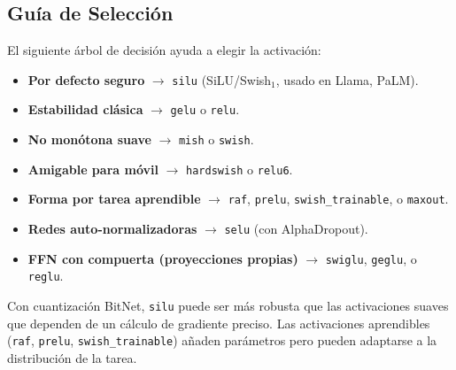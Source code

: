 \subsection{Guía de Selección}

El siguiente árbol de decisión ayuda a elegir la activación:
\begin{itemize}[leftmargin=*]
  \item \textbf{Por defecto seguro} $\to$ \texttt{silu} (SiLU/Swish$_1$, usado
    en Llama, PaLM).
  \item \textbf{Estabilidad clásica} $\to$ \texttt{gelu} o \texttt{relu}.
  \item \textbf{No monótona suave} $\to$ \texttt{mish} o \texttt{swish}.
  \item \textbf{Amigable para móvil} $\to$ \texttt{hardswish} o \texttt{relu6}.
  \item \textbf{Forma por tarea aprendible} $\to$ \texttt{raf},
    \texttt{prelu}, \texttt{swish\_trainable}, o \texttt{maxout}.
  \item \textbf{Redes auto-normalizadoras} $\to$ \texttt{selu} (con
    AlphaDropout).
  \item \textbf{FFN con compuerta (proyecciones propias)} $\to$
    \texttt{swiglu}, \texttt{geglu}, o \texttt{reglu}.
\end{itemize}

\noindent Con cuantización BitNet, \texttt{silu} puede ser más robusta que las
activaciones suaves que dependen de un cálculo de gradiente preciso. Las
activaciones aprendibles (\texttt{raf}, \texttt{prelu},
\texttt{swish\_trainable}) añaden parámetros pero pueden adaptarse a la
distribución de la tarea.
